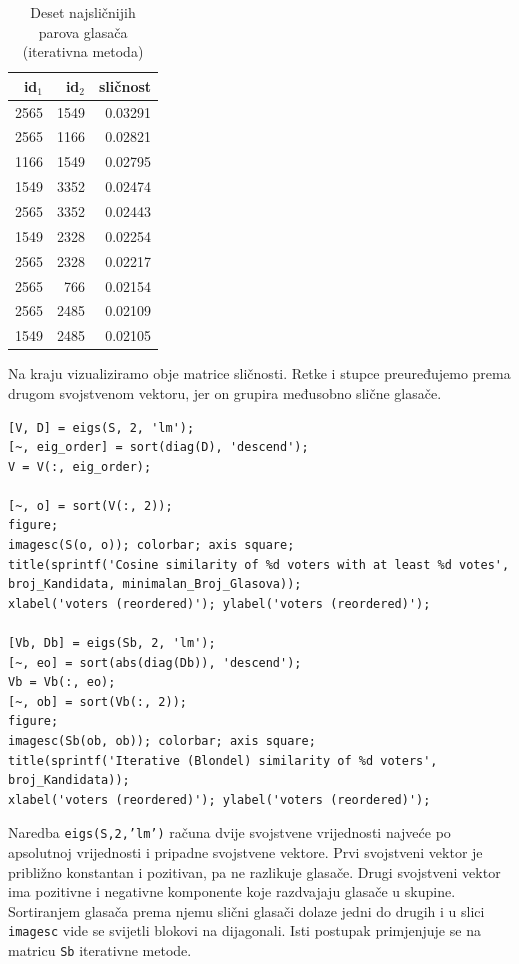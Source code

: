 \documentclass[12pt, letterpaper]{article}
\numberwithin{figure}{section}
\begin{document}
\begin{table}[H]
    \centering
    \caption{Deset najsličnijih parova glasača (iterativna metoda)}
    \label{tab:wiki_iterativna}
    \begin{tabular}{rrr}
        \toprule
        id$_1$ & id$_2$ & sličnost \\
        \midrule
        2565 & 1549 & 0.03291 \\
        2565 & 1166 & 0.02821 \\
        1166 & 1549 & 0.02795 \\
        1549 & 3352 & 0.02474 \\
        2565 & 3352 & 0.02443 \\
        1549 & 2328 & 0.02254 \\
        2565 & 2328 & 0.02217 \\
        2565 & 766  & 0.02154 \\
        2565 & 2485 & 0.02109 \\
        1549 & 2485 & 0.02105 \\
        \bottomrule
    \end{tabular}
\end{table}
      
Na kraju vizualiziramo obje matrice sličnosti. Retke i stupce preuređujemo prema drugom svojstvenom vektoru, jer on grupira međusobno slične glasače.

\begin{lstlisting}[style=octave, caption={Vizualizacija matrica sličnosti}, label={lst:wiki_vizualizacija}]
[V, D] = eigs(S, 2, 'lm');
[~, eig_order] = sort(diag(D), 'descend');
V = V(:, eig_order);

[~, o] = sort(V(:, 2));       
figure;
imagesc(S(o, o)); colorbar; axis square;
title(sprintf('Cosine similarity of %d voters with at least %d votes', broj_Kandidata, minimalan_Broj_Glasova));
xlabel('voters (reordered)'); ylabel('voters (reordered)');

[Vb, Db] = eigs(Sb, 2, 'lm');
[~, eo] = sort(abs(diag(Db)), 'descend');
Vb = Vb(:, eo);
[~, ob] = sort(Vb(:, 2));
figure;
imagesc(Sb(ob, ob)); colorbar; axis square;
title(sprintf('Iterative (Blondel) similarity of %d voters', broj_Kandidata));
xlabel('voters (reordered)'); ylabel('voters (reordered)');
\end{lstlisting}
Naredba \texttt{eigs(S,2,'lm')} računa dvije svojstvene vrijednosti najveće po apsolutnoj vrijednosti i pripadne svojstvene vektore. Prvi svojstveni vektor je približno konstantan i pozitivan, pa ne razlikuje glasače. Drugi svojstveni vektor ima pozitivne i negativne komponente koje razdvajaju glasače u skupine. Sortiranjem glasača prema njemu slični glasači dolaze jedni do drugih i u slici \texttt{imagesc} vide se svijetli blokovi na dijagonali. Isti postupak primjenjuje se na matricu \texttt{Sb} iterativne metode.
\end{document}
